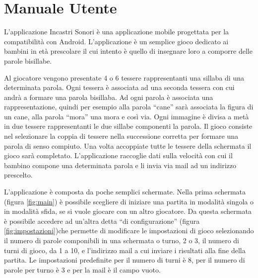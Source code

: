 \renewcommand*{\mypath}{legodigitalsonoro1}%
\graphicspath{{\mypath/images/}}

\localtoc

\newcommand{\includefigure}[2]{
\begin{figure}[h!]
\centering{
\texttt{[image: \#1.png]}}
\caption{#2}
\label{fig:#1}
\end{figure}
}

\section{Manuale Utente}

L'applicazione Incastri Sonori è una applicazione mobile progettata per la compatibilità con Android. L'applicazione è un semplice gioco dedicato ai bambini in età prescolare il cui intento è quello di insegnare loro a comporre delle parole bisillabe.

Al giocatore vengono presentate 4 o 6 tessere rappresentanti una sillaba di una determinata parola. Ogni tessera è associata ad una seconda tessera con cui andrà a formare una parola bisillaba. Ad ogni parola è associata una rappresentazione, quindi per esempio alla parola ``cane'' sarà associata la figura di un cane, alla parola ``mora'' una mora e così via. Ogni immagine è divisa a metà in due tessere rappresentanti le due sillabe componenti la parola. Il gioco consiste nel selezionare la coppia di tessere nella successione corretta per formare una parola di senso compiuto. Una volta accoppiate tutte le tessere della schermata il gioco sarà completato. L'applicazione raccoglie dati sulla velocità con cui il bambino compone una determinata parola e li invia via mail ad un indirizzo prescelto.

L'applicazione è composta da poche semplici schermate. Nella prima schermata (figura \ref{fig:main}) è possibile scegliere di iniziare una partita in modalità singola o in modalità sfida, se si vuole giocare con un altro giocatore. Da questa schermata è possibile accedere ad un'altra detta ``di configurazione'' (figura \ref{fig:impostazioni})che permette di modificare le impostazioni di gioco selezionando il numero di parole componibili in una schermata o turno, 2 o 3, il numero di turni di gioco, da 1 a 10, e l'indirizzo mail a cui inviare i risultati alla fine della partita. Le impostazioni predefinite per il numero di turni è 8, per il numero di parole per turno è 3 e per la mail è il campo vuoto.

